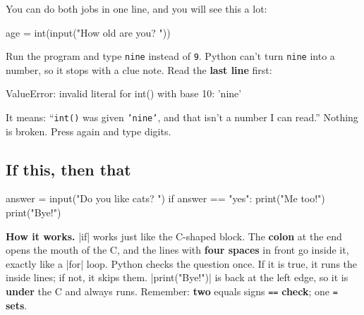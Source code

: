 You can do both jobs in one line, and you will see this a lot:
\begin{codenonum}
age = int(input("How old are you? "))
\end{codenonum}

\begin{watchout}
Run the program and type \texttt{nine} instead of \texttt{9}. Python can't turn \texttt{nine} into a number, so it stops with a clue note. Read the \textbf{last line} first:
\begin{errorbox}
ValueError: invalid literal for int() with base 10: 'nine'
\end{errorbox}
It means: ``\texttt{int()} was given \texttt{'nine'}, and that isn't a number I can read.'' Nothing is broken. Press \playbtn{} again and type digits.
\end{watchout}

\subsection*{If this, then that}

\begin{tcbraster}[raster columns=2, raster equal height=rows, raster column skip=12pt, raster valign=center, raster force size=false, raster column 1/.style={width=0.36\linewidth}, raster column 2/.style={width=0.64\linewidth-12pt}]
\begin{tcolorbox}[colback=white, colframe=white, boxrule=0pt, valign=center, left=0pt, right=0pt]
\begin{scratch}
\end{scratch}
\end{tcolorbox}
\begin{code}
answer = input("Do you like cats? ")
if answer == "yes":
    print("Me too!")
print("Bye!")
\end{code}
\end{tcbraster}

\textbf{How it works.} \py|if| works just like the C-shaped  block. The \textbf{colon} at the end opens the mouth of the C, and the lines with \textbf{four spaces} in front go inside it, exactly like a \py|for| loop. Python checks the question once. If it is true, it runs the inside lines; if not, it skips them. \py|print("Bye!")| is back at the left edge, so it is \textbf{under} the C and always runs. Remember: \textbf{two} equals signs \texttt{==} \textbf{check}; one \texttt{=} \textbf{sets}.

